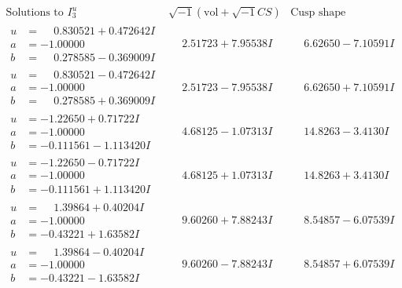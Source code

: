 \documentclass[1p]{elsarticle_modified}
\theoremstyle{definition}
\newcommand{\I}{\sqrt{-1}}
\begin{document}
$$\begin{array}{c|c|c}  
\text{Solutions to }I^u_{3}& \I (\text{vol} + \sqrt{-1}CS) & \text{Cusp shape}\\
 \hline 
\begin{aligned}
u &= \phantom{-}0.830521 + 0.472642 I \\
a &= -1.00000\phantom{ +0.000000I} \\
b &= \phantom{-}0.278585 - 0.369009 I\end{aligned}
 & \phantom{-}2.51723 + 7.95538 I & \phantom{-}6.62650 - 7.10591 I \\ \hline\begin{aligned}
u &= \phantom{-}0.830521 - 0.472642 I \\
a &= -1.00000\phantom{ +0.000000I} \\
b &= \phantom{-}0.278585 + 0.369009 I\end{aligned}
 & \phantom{-}2.51723 - 7.95538 I & \phantom{-}6.62650 + 7.10591 I \\ \hline\begin{aligned}
u &= -1.22650 + 0.71722 I \\
a &= -1.00000\phantom{ +0.000000I} \\
b &= -0.111561 - 1.113420 I\end{aligned}
 & \phantom{-}4.68125 - 1.07313 I & \phantom{-}14.8263 - 3.4130 I \\ \hline\begin{aligned}
u &= -1.22650 - 0.71722 I \\
a &= -1.00000\phantom{ +0.000000I} \\
b &= -0.111561 + 1.113420 I\end{aligned}
 & \phantom{-}4.68125 + 1.07313 I & \phantom{-}14.8263 + 3.4130 I \\ \hline\begin{aligned}
u &= \phantom{-}1.39864 + 0.40204 I \\
a &= -1.00000\phantom{ +0.000000I} \\
b &= -0.43221 + 1.63582 I\end{aligned}
 & \phantom{-}9.60260 + 7.88243 I & \phantom{-}8.54857 - 6.07539 I \\ \hline\begin{aligned}
u &= \phantom{-}1.39864 - 0.40204 I \\
a &= -1.00000\phantom{ +0.000000I} \\
b &= -0.43221 - 1.63582 I\end{aligned}
 & \phantom{-}9.60260 - 7.88243 I & \phantom{-}8.54857 + 6.07539 I \\ \hline\begin{aligned}

\end{aligned}
\end{array}$$
\end{document}
